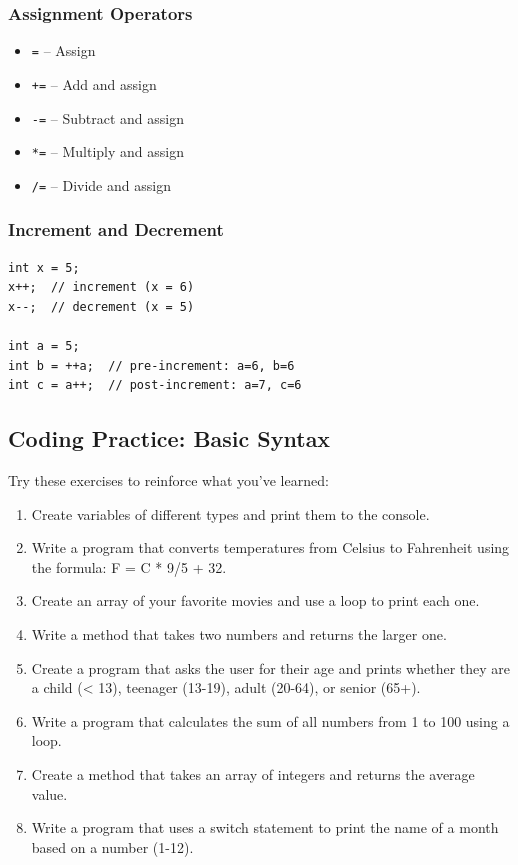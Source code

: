 \documentclass{article}
\begin{document}
\subsubsection{Assignment Operators}
\begin{itemize}
    \item \texttt{=} -- Assign
    \item \texttt{+=} -- Add and assign
    \item \texttt{-=} -- Subtract and assign
    \item \texttt{*=} -- Multiply and assign
    \item \texttt{/=} -- Divide and assign
\end{itemize}

\subsubsection{Increment and Decrement}
\begin{verbatim}
int x = 5;
x++;  // increment (x = 6)
x--;  // decrement (x = 5)

int a = 5;
int b = ++a;  // pre-increment: a=6, b=6
int c = a++;  // post-increment: a=7, c=6
\end{verbatim}

\subsection{Coding Practice: Basic Syntax}
Try these exercises to reinforce what you've learned:

\begin{enumerate}
    \item Create variables of different types and print them to the console.
    \item Write a program that converts temperatures from Celsius to Fahrenheit using the formula: F = C * 9/5 + 32.
    \item Create an array of your favorite movies and use a loop to print each one.
    \item Write a method that takes two numbers and returns the larger one.
    \item Create a program that asks the user for their age and prints whether they are a child (< 13), teenager (13-19), adult (20-64), or senior (65+).
    \item Write a program that calculates the sum of all numbers from 1 to 100 using a loop.
    \item Create a method that takes an array of integers and returns the average value.
    \item Write a program that uses a switch statement to print the name of a month based on a number (1-12).
\end{enumerate}
\end{document}
